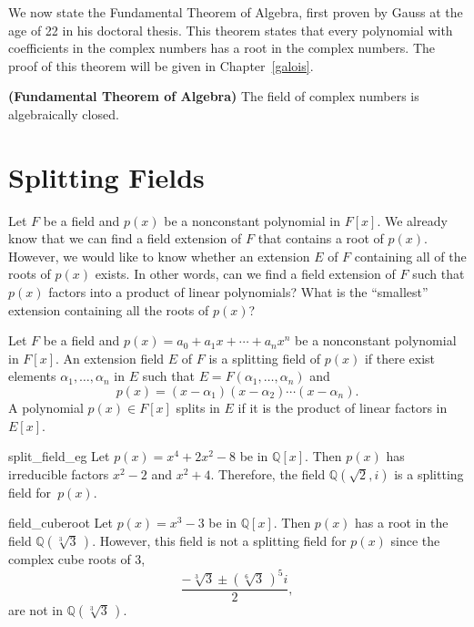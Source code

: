 We now state the  Fundamental Theorem of Algebra, first proven by
Gauss at the age of 22 in his doctoral thesis. This theorem states
that every polynomial with coefficients in the complex numbers has a
root in the complex numbers.  The proof of this theorem will be given
in Chapter~\ref{galois}.  
 

\begin{theorem} {\bf (Fundamental Theorem of
Algebra)}
The field of complex numbers is algebraically closed.
\end{theorem}


 
\section{Splitting Fields}


Let $F$ be a field and $p(x)$ be a nonconstant polynomial in $F[x]$.
We already know that we can find a field extension of $F$ that
contains a root of $p(x)$. However, we would like to know whether an
extension $E$ of $F$ containing all of the roots of $p(x)$ exists.
In other words, can we find a field extension of $F$ such that $p(x)$
factors into a product of linear polynomials? What is the ``smallest''
extension containing all the roots of $p(x)$? 

 
Let $F$ be a field and $p(x) = a_0 + a_1 x + \cdots + a_n x^n$ be a
nonconstant polynomial in $F[x]$. An extension field $E$ of $F$ is a
{\bfi splitting field\/}
of $p(x)$ if there exist elements $\alpha_1, \ldots, \alpha_n$ in $E$
such that $E = F( \alpha_1, \ldots, \alpha_n )$ and 
\[
p(x) = ( x - \alpha_1 )(x - \alpha_2) \cdots (x - \alpha_n).
\]
A polynomial $p(x) \in F[x]$ {\bfi splits\/} in $E$ if it is the
product of linear factors in~$E[x]$.   
 

\begin{example}{split_field_eg}
Let $p(x) = x^4 + 2x^2 - 8$ be in ${\mathbb Q}[x]$. Then $p(x)$ has
irreducible factors $x^2 -2$ and $x^2 + 4$. Therefore, the field
${\mathbb Q}( \sqrt{2}, i )$ is a splitting field for~$p(x)$. 
\end{example}
 

\begin{example}{field_cuberoot}
Let $p(x) = x^3 -3$ be in ${\mathbb Q}[x]$. Then $p(x)$ has a root in
the field ${\mathbb Q}( \sqrt[3]{3}\, )$.  However, this field is not a
splitting field for $p(x)$ since the complex cube roots of 3,
\[
\frac{-\sqrt[3]{3} \pm (\sqrt[6]{3}\, )^5 i }{2},
\]
are not 
in ${\mathbb Q}( \sqrt[3]{3}\, )$.
\end{example}
 
